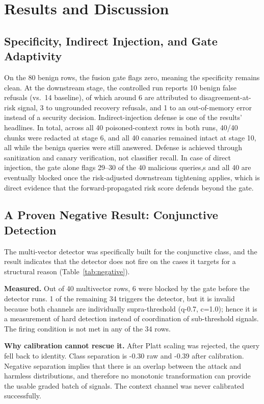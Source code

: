 \documentclass[conference]{IEEEtran}
\begin{document}
\section{Results and Discussion}\label{sec:results}
\subsection{Specificity, Indirect Injection, and Gate Adaptivity}
On the 80 benign rows, the fusion gate flags zero, meaning the specificity remains clean. At the downstream stage, the controlled run reports 10 benign false refusals (vs.\ 14 baseline), of which around 6 are attributed to disagreement-at-risk signal, 3 to ungrounded recovery refusals, and 1 to an out-of-memory error instead of a security decision. Indirect-injection defense is one of the results' headlines. In total, across all 40 poisoned-context rows in both runs, 40/40 chunks were redacted at stage 6, and all 40 canaries remained intact at stage 10, all while the benign queries were still answered. Defense is achieved through sanitization and canary verification, not classifier recall. In case of direct injection, the gate alone flags 29--30 of the 40 malicious queries,s and all 40 are eventually blocked once the risk-adjusted downstream tightening applies, which is direct evidence that the forward-propagated risk score defends beyond the gate.

\subsection{A Proven Negative Result: Conjunctive Detection}\label{sec:negative}
The multi-vector detector was specifically built for the conjunctive class, and the result indicates that the detector does not fire on the cases it targets for a structural reason (Table~\ref{tab:negative}).

\textbf{Measured.} Out of 40 multivector rows, 6 were blocked by the gate before the detector runs. 1 of the remaining 34 triggers the detector, but it is invalid because both channels are individually supra-threshold (q-0.7, c=1.0); hence it is a measurement of hard detection instead of coordination of sub-threshold signals. The firing condition is not met in any of the 34 rows.

\textbf{Why calibration cannot rescue it.} After Platt scaling was rejected, the query fell back to identity. Class separation is -0.30 raw and -0.39 after calibration. Negative separation implies that there is an overlap between the attack and harmless distributions, and therefore no monotonic transformation can provide the usable graded batch of signals. The context channel was never calibrated successfully.
\end{document}
